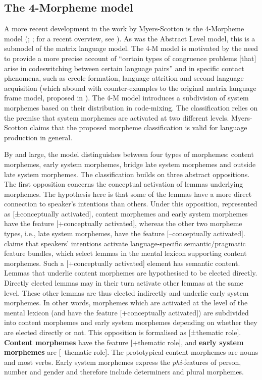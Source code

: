 \subsection{The 4-Morpheme model}
A more recent development in the work by Myers-Scotton is the 4-Morpheme model (\citeyear{myers-scotton-matrix-2001}; \citeyear[73--82]{myers-scotton-contact-2002}; for a recent overview, see \citealt[][]{myers-scotton-jake16}). As was the Abstract Level model, this is a submodel of the matrix language model. The 4-M model is motivated by the need to provide a more precise account of ``certain types of congruence problems [that] arise in codeswitching between certain language pairs'' \citep[42]{myers-scotton-matrix-2001} and in specific contact phenomena, such as creole formation, language attrition and second language acquisition (which abound with counter-examples to the original matrix language frame model, proposed in \citealt{myers-scotton-duelling-1993}). The 4-M model introduces a subdivision of system morphemes based on their distribution in code-mixing. The classification relies on the premise that system morphemes are activated at two different levels. Myers-Scotton claims that the proposed morpheme classification is valid for language production in general.

By and large, the model distinguishes between four types of morphemes: content morphemes, early system morphemes, bridge late system morphemes and outside late system morphemes. The classification builds on three abstract oppositions. The first opposition concerns the conceptual activation of lemmas underlying morphemes. The hypothesis here is that some of the lemmas have a more direct connection to speaker's intentions than others. Under this opposition, represented as [±conceptually activated], content morphemes and early system morphemes have the feature [+conceptually activated], whereas the other two morpheme types, i.e., late system morphemes, have the feature [--conceptually activated]. \citet{myers-scotton-contact-2002} claims that speakers' intentions activate language-specific semantic/pragmatic feature bundles, which select lemmas in the mental lexicon supporting content morphemes. Such a [+conceptually activated] element has semantic content. Lemmas that underlie content morphemes are hypothesised to be elected directly. Directly elected lemmas may in their turn activate other lemmas at the same level. These other lemmas are thus elected indirectly and underlie early system morphemes. In other words, morphemes  which are activated at the level of the mental lexicon (and have the feature [+conceptually activated]) are subdivided into content morphemes and early system morphemes depending on whether they are elected directly or not. This opposition is formalised as [±thematic role]. \textbf{Content morphemes} have the feature [+thematic role], and \textbf{early system morphemes} are [--thematic role]. The prototypical content morphemes are nouns and most verbs. Early system morphemes express the \textit{phi}-features of person, number and gender and therefore include determiners and plural morphemes.

